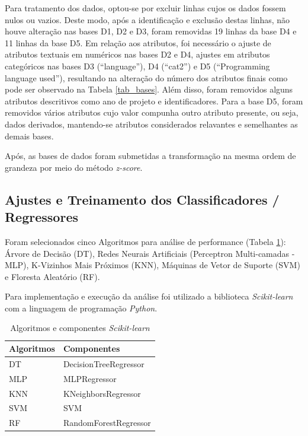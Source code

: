 \documentclass[12pt]{article}
\begin{document}
Para tratamento dos dados, optou-se por excluir linhas cujos os dados fossem nulos ou vazios. Deste modo, após a identificação e exclusão destas linhas, não houve alteração nas bases D1, D2 e D3, foram removidas 19 linhas da base D4 e 11 linhas da base D5. Em relação aos atributos, foi necessário o ajuste de atributos textuais em numéricos nas bases D2 e D4, ajustes em atributos categóricos nas bases D3 (``language''), D4 (``cat2'') e D5 (``Programming language used''), resultando na alteração do número dos atributos finais como pode ser observado na Tabela \ref{tab_bases}. Além disso, foram removidos alguns atributos descritivos como ano de projeto e identificadores. Para a base D5, foram removidos vários atributos cujo valor compunha outro atributo presente, ou seja, dados derivados, mantendo-se atributos considerados relavantes e semelhantes as demais bases.

Após, as bases de dados foram submetidas a transformação na mesma ordem de grandeza por meio do método \textit{z-score}.

\subsection{Ajustes e Treinamento dos Classificadores / Regressores}

Foram selecionados cinco Algoritmos para análise de performance (Tabela \ref{tab_algoritmos}): Árvore de Decisão (DT), Redes Neurais Artificiais (Perceptron Multi-camadas - MLP), K-Vizinhos Mais Próximos (KNN), Máquinas de Vetor de Suporte (SVM) e Floresta Aleatório (RF).

Para implementação e execução da análise foi utilizado a biblioteca \textit{Scikit-learn} \cite{scikitlearn:2011} com a linguagem de programação \textit{Python}.

\begin{table}[h!]
  \begin{center}
    \caption{Algoritmos e componentes \textit{Scikit-learn}}
    \label{tab_algoritmos}
    \begin{tabular}{l|l}
      \textbf{Algoritmos} & \textbf{Componentes}  \\
      \hline
      DT                  & DecisionTreeRegressor \\
      MLP                 & MLPRegressor          \\
      KNN                 & KNeighborsRegressor   \\
      SVM                 & SVM                   \\
      RF                  & RandomForestRegressor \\
    \end{tabular}
  \end{center}
\end{table}
\end{document}

